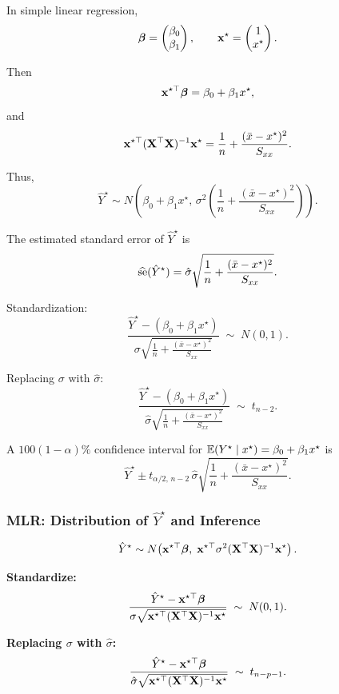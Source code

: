 In simple linear regression,
\[
\boldsymbol{\beta}
=
\begin{pmatrix}
\beta_0\\
\beta_1
\end{pmatrix},
\qquad
\mathbf{x}^\star
=
\begin{pmatrix}
1\\
x^\star
\end{pmatrix}.
\]

Then
\[
\mathbf{x}^{\star\top}\boldsymbol{\beta}
=
\beta_0 + \beta_1 x^\star,
\]
and
\[
\mathbf{x}^{\star\top}(\mathbf{X}^\top\mathbf{X})^{-1}\mathbf{x}^\star
=
\frac{1}{n}
+
\frac{(\bar{x}-x^\star)^2}{S_{xx}}.
\]

Thus,
\[
\hat{Y}^\star
\sim
N\!\left(
\beta_0 + \beta_1 x^\star,\,
\sigma^2\!\left(
\frac{1}{n}
+
\frac{(\bar{x}-x^\star)^2}{S_{xx}}
\right)
\right).
\]

The estimated standard error of $\hat{Y}^\star$ is
\[
\widehat{\mathrm{se}}(\hat{Y}^\star)
=
\hat{\sigma}
\sqrt{
\frac{1}{n}
+
\frac{(\bar{x}-x^\star)^2}{S_{xx}}
}.
\]

Standardization:
\[
\frac{
\hat{Y}^\star - (\beta_0 + \beta_1 x^\star)
}{
\sigma
\sqrt{
\frac{1}{n}
+
\frac{(\bar{x}-x^\star)^2}{S_{xx}}
}
}
\;\sim\;
N(0,1).
\]

Replacing $\sigma$ with $\hat{\sigma}$:
\[
\frac{
\hat{Y}^\star - (\beta_0 + \beta_1 x^\star)
}{
\hat{\sigma}
\sqrt{
\frac{1}{n}
+
\frac{(\bar{x}-x^\star)^2}{S_{xx}}
}
}
\;\sim\;
t_{n-2}.
\]

\begin{keyresult}
A $100(1-\alpha)\%$ confidence interval for $\mathbb{E}(Y^\star \mid x^\star) = \beta_0 + \beta_1 x^\star$ is
\[
\hat{Y}^\star
\pm
t_{\alpha/2,\,n-2}\,
\hat{\sigma}
\sqrt{
\frac{1}{n}
+
\frac{(\bar{x}-x^\star)^2}{S_{xx}}
}.
\]
\end{keyresult}

\subsubsection{MLR: Distribution of $\hat{Y}^\star$ and Inference}

\[
\hat{Y}^\star
\sim
N\!\left(
\mathbf{x}^{\star\top}\boldsymbol{\beta},
\;
\mathbf{x}^{\star\top}\sigma^2(\mathbf{X}^\top\mathbf{X})^{-1}\mathbf{x}^\star
\right).
\]

\textbf{Standardize:}
\[
\frac{
\hat{Y}^\star - \mathbf{x}^{\star\top}\boldsymbol{\beta}
}{
\sigma
\sqrt{
\mathbf{x}^{\star\top}(\mathbf{X}^\top\mathbf{X})^{-1}\mathbf{x}^\star
}
}
\;\sim\;
N(0,1).
\]

\textbf{Replacing $\sigma$ with $\hat{\sigma}$:}
\[
\frac{
\hat{Y}^\star - \mathbf{x}^{\star\top}\boldsymbol{\beta}
}{
\hat{\sigma}
\sqrt{
\mathbf{x}^{\star\top}(\mathbf{X}^\top\mathbf{X})^{-1}\mathbf{x}^\star
}
}
\;\sim\;
t_{n-p-1}.
\]

